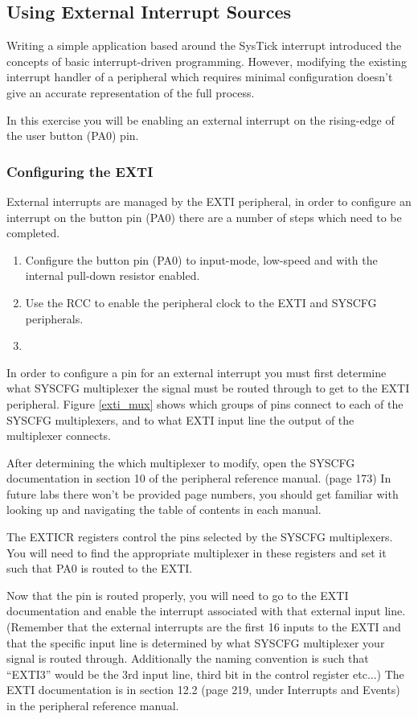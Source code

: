 \documentclass[11pt,fleqn]{book} %
\begin{document}
\subsection{Using External Interrupt Sources}
Writing a simple application based around the SysTick interrupt introduced the concepts of basic interrupt-driven programming. However, modifying the existing interrupt handler of a peripheral which requires minimal configuration doesn't give an accurate representation of the full process.  

In this exercise you will be enabling an external interrupt on the rising-edge of the user button (PA0) pin. 

\subsubsection{Configuring the EXTI}
External interrupts are managed by the EXTI peripheral, in order to configure an interrupt on the button pin (PA0) there are a number of steps which need to be completed. 
\begin{enumerate}
    \item Configure the button pin (PA0) to input-mode, low-speed and with the internal pull-down resistor enabled. 
    \item Use the RCC to enable the peripheral clock to the EXTI and SYSCFG peripherals.
    \item 
\end{enumerate}

In order to configure a pin for an external interrupt you must first determine what SYSCFG multiplexer the signal must be routed through to get to the EXTI peripheral. Figure \ref{exti_mux} shows which groups of pins connect to each of the SYSCFG multiplexers, and to what EXTI input line the output of the multiplexer connects.

After determining the which multiplexer to modify, open the SYSCFG documentation in section 10 of the peripheral reference manual. (page 173) In future labs there won't be provided page numbers, you should get familiar with looking up and navigating the table of contents in each manual.

The EXTICR registers control the pins selected by the SYSCFG multiplexers. You will need to find the appropriate multiplexer in these registers and set it such that PA0 is routed to the EXTI.

Now that the pin is routed properly, you will need to go to the EXTI documentation and enable the interrupt associated with that external input line. (Remember that the external interrupts are the first 16 inputs to the EXTI and that the specific input line is determined by what SYSCFG multiplexer your signal is routed through. Additionally the naming convention is such that ``EXTI3'' would be the 3rd input line, third bit in the control register etc...) 
The EXTI documentation is in section 12.2 (page 219, under Interrupts and Events) in the peripheral reference manual. 
\end{document}
